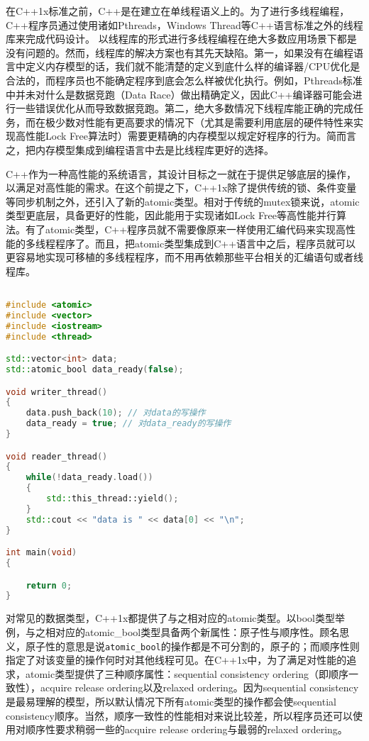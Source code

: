 在C++1x标准之前，C++是在建立在单线程语义上的。为了进行多线程编程，C++程序员通过使用诸如Pthreads，Windows Thread等C++语言标准之外的线程库来完成代码设计。
以线程库的形式进行多线程编程在绝大多数应用场景下都是没有问题的。然而，线程库的解决方案也有其先天缺陷。第一，如果没有在编程语言中定义内存模型的话，我们就不能清楚的定义到底什么样的编译器/CPU优化是合法的，而程序员也不能确定程序到底会怎么样被优化执行。例如，Pthreads标准中并未对什么是数据竞跑（Data Race）做出精确定义，因此C++编译器可能会进行一些错误优化从而导致数据竞跑。第二，绝大多数情况下线程库能正确的完成任务，而在极少数对性能有更高要求的情况下（尤其是需要利用底层的硬件特性来实现高性能Lock Free算法时）需要更精确的内存模型以规定好程序的行为。简而言之，把内存模型集成到编程语言中去是比线程库更好的选择。

C++作为一种高性能的系统语言，其设计目标之一就在于提供足够底层的操作，以满足对高性能的需求。在这个前提之下，C++1x除了提供传统的锁、条件变量等同步机制之外，还引入了新的atomic类型。相对于传统的mutex锁来说，atomic类型更底层，具备更好的性能，因此能用于实现诸如Lock Free等高性能并行算法。有了atomic类型，C++程序员就不需要像原来一样使用汇编代码来实现高性能的多线程程序了。而且，把atomic类型集成到C++语言中之后，程序员就可以更容易地实现可移植的多线程程序，而不用再依赖那些平台相关的汇编语句或者线程库。

\begin{lstlisting}[language=C++]

#include <atomic>
#include <vector>
#include <iostream>
#include <thread>  

std::vector<int> data;
std::atomic_bool data_ready(false);

void writer_thread()
{
    data.push_back(10); // 对data的写操作
    data_ready = true; // 对data_ready的写操作
}

void reader_thread()
{
    while(!data_ready.load()) 
    {   
        std::this_thread::yield();
    }   
    std::cout << "data is " << data[0] << "\n";
}

int main(void)
{

    return 0;
}                                    

\end{lstlisting}

对常见的数据类型，C++1x都提供了与之相对应的atomic类型。以bool类型举例，与之相对应的atomic\_bool类型具备两个新属性：原子性与顺序性。顾名思义，原子性的意思是说\verb$atomic_bool$的操作都是不可分割的，原子的；而顺序性则指定了对该变量的操作何时对其他线程可见。在C++1x中，为了满足对性能的追求，atomic类型提供了三种顺序属性：sequential consistency ordering（即顺序一致性），acquire release ordering以及relaxed ordering。因为sequential consistency是最易理解的模型，所以默认情况下所有atomic类型的操作都会使sequential consistency顺序。当然，顺序一致性的性能相对来说比较差，所以程序员还可以使用对顺序性要求稍弱一些的acquire release ordering与最弱的relaxed ordering。


